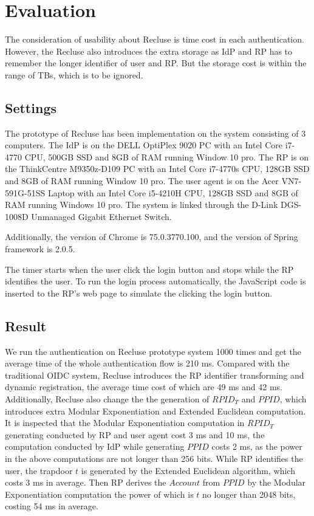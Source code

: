 \section{Evaluation}
\label{sec:evaluation}
The consideration of usability about Recluse is time cost in each authentication. However, the Recluse also introduces the extra storage as IdP and RP has to remember the longer identifier of user and RP. But the storage cost is within the range of TBs, which is to be ignored.  

\subsection{Settings}
The prototype of Recluse has been implementation on the system consisting of 3 computers.
The IdP is on the DELL OptiPlex 9020 PC with an Intel Core i7-4770 CPU, 500GB SSD and 8GB of RAM running Window 10 pro. The RP is on the ThinkCentre M9350z-D109 PC with an Intel Core i7-4770s CPU, 128GB SSD and 8GB of RAM running Window 10 pro. The user agent is on the Acer VN7-591G-51SS Laptop with an Intel Core i5-4210H CPU, 128GB SSD and 8GB of RAM running Windows 10 pro.
The system is linked through the D-Link DGS-1008D Unmanaged Gigabit Ethernet Switch. 

Additionally, the version of Chrome is 75.0.3770.100, and the version of Spring framework is 2.0.5.

The timer starts when the user click the login button and stops while the RP identifies the user. To run the login process automatically, the JavaScript code is inserted to the RP's web page to simulate the clicking the login button. 

\subsection{Result}
We run the authentication on Recluse prototype system 1000 times and get the average time of the whole authentication flow is 210 ms. Compared with the traditional OIDC system, Recluse introduces the RP identifier transforming and dynamic registration, the average time cost of which are 49 ms and 42 ms. Additionally, Recluse also change the the generation of $RPID_T$ and $PPID$, which introduces extra Modular Exponentiation and Extended Euclidean computation. It is inspected that the Modular Exponentiation computation in $RPID_T$ generating conducted by RP and user agent cost 3 ms and 10 ms, the computation conducted by IdP while generating $PPID$ costs 2 ms, as the power in the above computations are not longer than 256 bits. While RP identifies the user, the trapdoor $t$ is generated by the Extended Euclidean algorithm, which costs 3 ms in average. Then RP derives the $Account$ from $PPID$ by the Modular Exponentiation computation the power of which is $t$ no longer than 2048 bits, costing 54 ms in average. 

